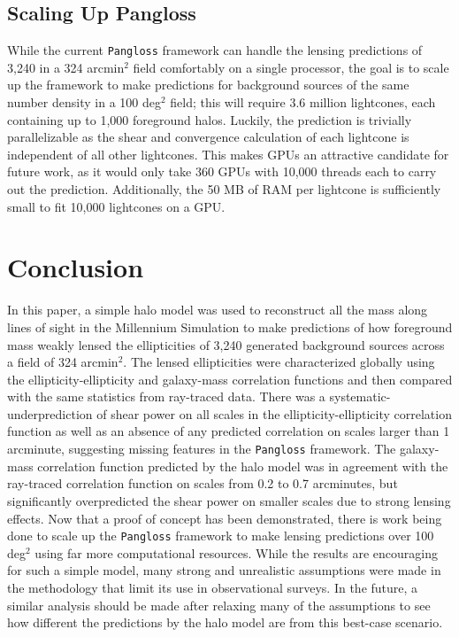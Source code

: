 \documentclass[%
 reprint,
 amsmath,amssymb,
 aps,nofootinbib
]{revtex4-1}
\begin{document}
\subsection*{Scaling Up Pangloss}

While the current \texttt{Pangloss} framework can handle the lensing predictions of 3,240 in a 324 arcmin$^2$ field comfortably on a single processor, the goal is to scale up the framework to make predictions for background sources of the same number density in a 100 deg$^2$ field; this will require 3.6 million lightcones, each containing up to 1,000 foreground halos. Luckily, the prediction is trivially parallelizable as the shear and convergence calculation of each lightcone is independent of all other lightcones. This makes GPUs an attractive candidate for future work, as it would only take 360 GPUs with 10,000 threads each to carry out the prediction. Additionally, the 50 MB of RAM per lightcone is sufficiently small to fit 10,000 lightcones on a GPU.

\section{Conclusion}

In this paper, a simple halo model was used to reconstruct all the mass along lines of sight in the Millennium Simulation to make predictions of how foreground mass weakly lensed the ellipticities of 3,240 generated background sources across a field of 324 arcmin$^2$. The lensed ellipticities were characterized globally using the ellipticity-ellipticity and galaxy-mass correlation functions and then compared with the same statistics from ray-traced data. There was a systematic-underprediction of shear power on all scales in the ellipticity-ellipticity correlation function as well as an absence of any predicted correlation on scales larger than 1 arcminute, suggesting missing features in the \texttt{Pangloss} framework. The galaxy-mass correlation function predicted by the halo model was in agreement with the ray-traced correlation function on scales from 0.2 to 0.7 arcminutes, but significantly overpredicted the shear power on smaller scales due to strong lensing effects. Now that a proof of concept has been demonstrated, there is work being done to scale up the \texttt{Pangloss} framework to make lensing predictions over 100 deg$^2$ using far more computational resources. While the results are encouraging for such a simple model, many strong and unrealistic assumptions were made in the methodology that limit its use in observational surveys. In the future, a similar analysis should be made after relaxing many of the assumptions to see how different the predictions by the halo model are from this best-case scenario.  
\end{document}
